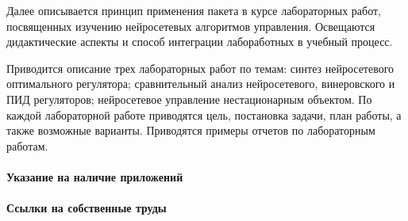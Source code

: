 Далее описывается принцип применения пакета в курсе лабораторных
работ, посвященных изучению нейросетевых алгоритмов управления.
Освещаются дидактические аспекты и способ интеграции лабоработных в
учебный процесс.

Приводится описание трех лабораторных работ по темам: синтез
нейросетевого оптимального регулятора; сравнительный анализ
нейросетевого, винеровского и ПИД регуляторов; нейросетевое управление
нестационарным объектом.  По каждой лабораторной работе приводятся
цель, постановка задачи, план работы, а также возможные варианты.
Приводятся примеры отчетов по лабораторным работам.

\paragraph{Указание на наличие приложений}

\paragraph{Ссылки на собственные труды}
